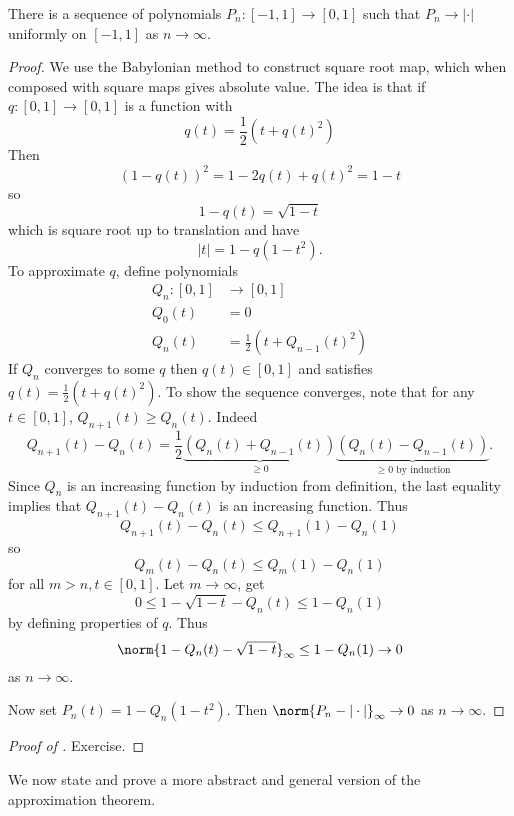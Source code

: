 \documentclass[a4paper]{article}
\begin{document}
\begin{lemma}
  \label{lem:approximation of absolute value}
  There is a sequence of polynomials \(P_n: [-1, 1] \to [0, 1]\) such that \(P_n \to |\cdot|\) uniformly on \([-1, 1]\) as \(n \to \infty\).
\end{lemma}

\begin{proof}
  We use the Babylonian method to construct square root map, which when composed with square maps gives absolute value. The idea is that if \(q: [0, 1] \to [0, 1]\) is a function with
  \[
    q(t) = \frac{1}{2}(t + q(t)^2)
  \]
  Then
  \[
    (1 - q(t))^2 = 1 - 2q(t)+ q(t)^2 = 1 - t
  \]
  so
  \[
    1 - q(t) = \sqrt{1 - t}
  \]
  which is square root up to translation and have
  \[
    |t| = 1 - q(1 - t^2).
  \]
  To approximate \(q\), define polynomials
  \begin{align*}
    Q_n: [0, 1] &\to [0, 1] \\
    Q_0(t) &= 0 \\
    Q_n(t) &= \frac{1}{2}(t + Q_{n - 1}(t)^2)
  \end{align*}
  If \(Q_n\) converges to some \(q\) then \(q(t) \in [0, 1]\) and satisfies \(q(t) = \frac{1}{2}(t + q(t)^2)\). To show the sequence converges, note that for any \(t \in [0, 1]\), \(Q_{n + 1}(t) \geq Q_n(t)\). Indeed
  \[
    Q_{n + 1}(t) - Q_n(t) = \frac{1}{2} \underbrace{(Q_n(t) + Q_{n - 1}(t))}_{\geq 0} \underbrace{(Q_n(t) - Q_{n - 1}(t))}_{\geq 0 \text{ by induction}}.
  \]
  Since \(Q_n\) is an increasing function by induction from definition, the last equality implies that \(Q_{n + 1}(t) - Q_n(t)\) is an increasing function. Thus
  \[
    Q_{n + 1}(t) - Q_n(t) \leq Q_{n + 1}(1) - Q_n(1)
  \]
  so
  \[
    Q_m(t) - Q_n(t) \leq Q_m(1) - Q_n(1)
  \]
  for all \(m > n, t \in [0, 1]\). Let \(m \to \infty\), get
  \[
    0 \leq 1 - \sqrt{1 - t} - Q_n(t) \leq 1 - Q_n(1)
  \]
  by defining properties of \(q\). Thus
  \[
    \norm{1 - Q_n(t) - \sqrt{1 - t}}_\infty \leq 1 - Q_n(1) \to 0
  \]
  as \(n \to \infty\).

  Now set \(P_n(t) = 1 - Q_n(1 - t^2)\). Then \(\norm{P_n - |\cdot|}_\infty \to 0\) as \(n \to \infty\).
\end{proof}

\begin{proof}[Proof of ]
  Exercise.
\end{proof}

We now state and prove a more abstract and general version of the approximation theorem.
\end{document}
